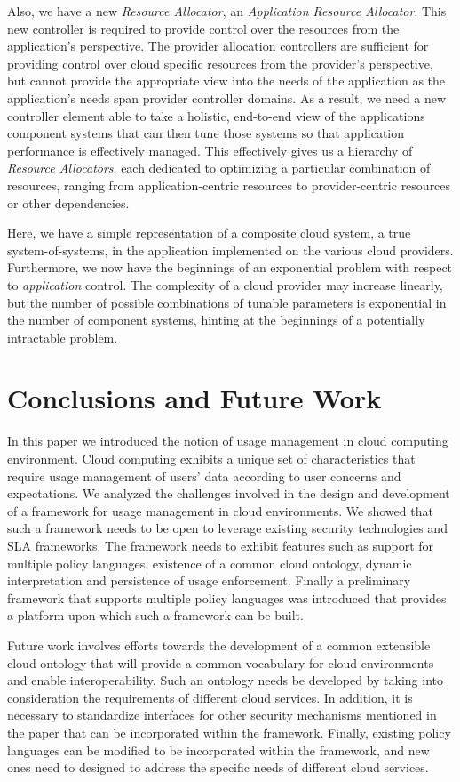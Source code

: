 \documentclass[10pt,letterpaper]{book}
\begin{document}
Also, we have a new \textit{Resource Allocator}, an \textit{Application Resource Allocator}.  This new controller is required to provide control over the resources from the application's perspective.  The provider allocation controllers are sufficient for providing control over cloud specific resources from the provider's perspective, but cannot provide the appropriate view into the needs of the application as the application's needs span provider controller domains. As a result, we need a new controller element able to take a holistic, end-to-end view of the applications component systems that can then tune those systems so that application performance is effectively managed.  This effectively gives us a hierarchy of \textit{Resource Allocators}, each dedicated to optimizing a particular combination of resources, ranging from application-centric resources to provider-centric resources or other dependencies.

Here, we have a simple representation of a composite cloud system, a true system-of-systems, in the application implemented on the various cloud providers.  Furthermore, we now have the beginnings of an exponential problem with respect to \textit{application} control.  The complexity of a cloud provider may increase linearly, but the number of possible combinations of tunable parameters is exponential in the number of component systems, hinting at the beginnings of a potentially intractable problem.

\section{Conclusions and Future Work}\label{sec:conclusions}
In this paper we introduced the notion of usage management in cloud computing environment. Cloud computing exhibits a unique set of characteristics that require usage management of users' data according to user concerns and expectations. We analyzed the challenges involved in the design and development of a framework for usage management in cloud environments. We showed that such a framework needs to be open to leverage existing security technologies and SLA frameworks. The framework needs to exhibit features such as support for multiple policy languages, existence of a common cloud ontology, dynamic interpretation and persistence of usage enforcement. Finally a preliminary framework that supports multiple policy languages was introduced that provides a platform upon which such a framework can be built. 

Future work involves efforts towards the development of a common extensible cloud ontology that will provide a common vocabulary for cloud environments and enable interoperability. Such an ontology needs be developed by taking into consideration the requirements of different cloud services. In addition, it is necessary to standardize interfaces for other security mechanisms mentioned in the paper that can be incorporated within the framework. Finally, existing policy languages can be modified to be incorporated within the framework, and new ones need to designed to address the specific needs of different cloud services. 



\end{document}
